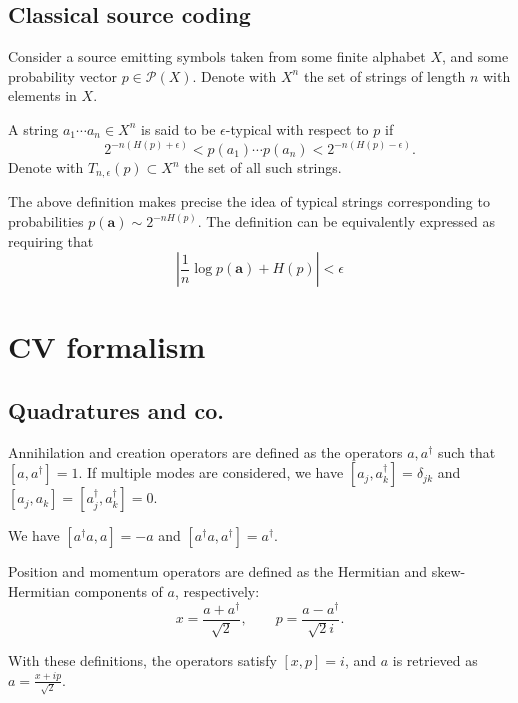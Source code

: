 \documentclass[a4paper]{report}
\newcommand{\bs}[1]{\boldsymbol{#1}}
\newcommand{\calP}{{\mathcal{P}}}
\begin{document}
\section{Classical source coding}

Consider a source emitting symbols taken from some finite alphabet $X$, and some probability vector $p\in \calP(X)$.
Denote with $X^n$ the set of strings of length $n$ with elements in $X$.

\begin{defn}
	A string $a_1\cdots a_n\in X^n$ is said to be $\epsilon$-typical with respect to $p$ if
	\begin{equation}
		2^{-n(H(p)+\epsilon)} < p(a_1)\cdots p(a_n) < 2^{-n(H(p)-\epsilon)}.
	\end{equation}
	Denote with $T_{n,\epsilon}(p)\subset X^n$ the set of all such strings.
\end{defn}

The above definition makes precise the idea of typical strings corresponding to probabilities $p(\bs a)\sim 2^{-nH(p)}$.
The definition can be equivalently expressed as requiring that
\begin{equation}
	\left\lvert \frac{1}{n}\log p(\bs a) + H(p) \right\rvert < \epsilon
\end{equation}

\chapter{CV formalism}
\minitoc

\section{Quadratures and co.}

\begin{defn}
	Annihilation and creation operators are defined as the operators $a,a^\dagger$ such that $[a,a^\dagger]=1$.
	If multiple modes are considered, we have $[a_j,a_k^\dagger]=\delta_{jk}$ and $[a_j,a_k]=[a_j^\dagger,a_k^\dagger]=0$.
\end{defn}

\begin{prop}
	We have $[a^\dagger a, a] = -a$ and
	$[a^\dagger a, a^\dagger] = a^\dagger$.
\end{prop}

\begin{defn}
	Position and momentum operators are defined as the Hermitian and skew-Hermitian components of $a$, respectively:
	\begin{equation}
		x = \frac{a + a^\dagger}{\sqrt2},
		\qquad
		p = \frac{a - a^\dagger}{\sqrt2 i}.
	\end{equation}
\end{defn}
With these definitions, the operators satisfy $[x,p]=i$, and $a$ is retrieved as
$a = \frac{x + ip}{\sqrt2}$.
\end{document}
